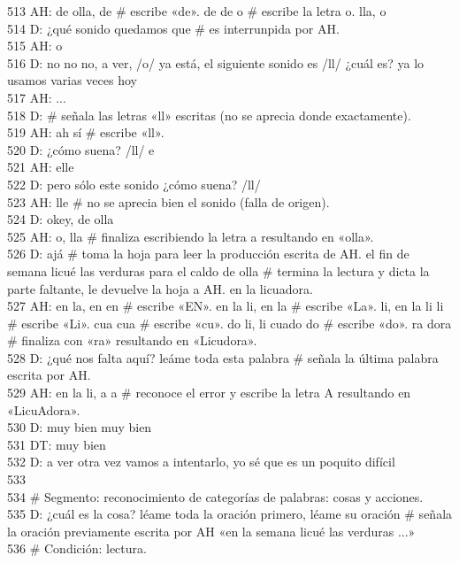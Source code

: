 513 AH: de olla, de \# escribe «de». de de o \# escribe la letra o. lla, o\\
514 D: ¿qué sonido quedamos que \# es interrunpida por AH.\\
515 AH: o\\
516 D: no no no, a ver, /o/ ya está, el siguiente sonido es /ll/ ¿cuál es? ya lo usamos varias veces hoy\\
517 AH: ...\\
518 D: \# señala las letras «ll» escritas (no se aprecia donde exactamente).\\
519 AH: ah sí \# escribe «ll».\\
520 D: ¿cómo suena? /ll/ e\\
521 AH: elle\\
522 D: pero sólo este sonido ¿cómo suena? /ll/\\
523 AH: lle \# no se aprecia bien el sonido (falla de origen).\\
524 D: okey, de olla\\
525 AH: o, lla \# finaliza escribiendo la letra a resultando en «olla».\\
526 D: ajá \# toma la hoja para leer la producción escrita de AH. el fin de semana licué las verduras para el caldo de olla \# termina la lectura y dicta la parte faltante, le devuelve la hoja a AH. en la licuadora.\\
527 AH: en la, en en \# escribe «EN». en la li, en la \# escribe «La». li, en la li li \# escribe «Li». cua cua \# escribe «cu». do li, li cuado do \# escribe «do». ra dora \# finaliza con «ra» resultando en «Licudora».\\
528 D: ¿qué nos falta aquí? leáme toda esta palabra \# señala la última palabra escrita por AH.\\
529 AH: en la li, a a \# reconoce el error y escribe la letra A resultando en «LicuAdora».\\
530 D: muy bien muy bien\\
531 DT: muy bien\\
532 D: a ver otra vez vamos a intentarlo, yo sé que es un poquito difícil\\
533 \\
534 \# Segmento: reconocimiento de categorías de palabras: cosas y acciones.\\
535 D: ¿cuál es la cosa? léame toda la oración primero, léame su oración \# señala la oración previamente escrita por AH «en la semana licué las verduras ...» \\
536 \# Condición: lectura.\\
